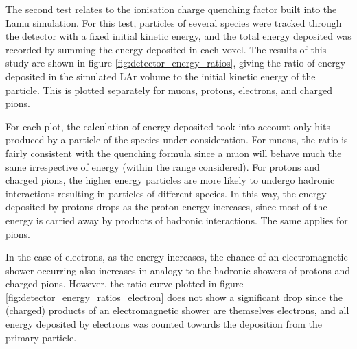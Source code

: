 The second test relates to the ionisation charge quenching factor built into the Lamu simulation. For this test, particles of several species were tracked through the detector with a fixed initial kinetic energy, and the total energy deposited was recorded by summing the energy deposited in each voxel. The results of this study are shown in figure \ref{fig:detector_energy_ratios}, giving the ratio of energy deposited in the simulated \ac{LAr} volume to the initial kinetic energy of the particle. This is plotted separately for muons, protons, electrons, and charged pions.

For each plot, the calculation of energy deposited took into account only hits produced by a particle of the species under consideration. For muons, the ratio is fairly consistent with the quenching formula since a muon will behave much the same irrespective of energy (within the range considered). For protons and charged pions, the higher energy particles are more likely to undergo hadronic interactions resulting in particles of different species. In this way, the energy deposited by protons drops as the proton energy increases, since most of the energy is carried away by products of hadronic interactions. The same applies for pions.

In the case of electrons, as the energy increases, the chance of an electromagnetic shower occurring also increases in analogy to the hadronic showers of protons and charged pions. However, the ratio curve plotted in figure \ref{fig:detector_energy_ratios_electron} does not show a significant drop since the (charged) products of an electromagnetic shower are themselves electrons, and all energy deposited by electrons was counted towards the deposition from the primary particle.

